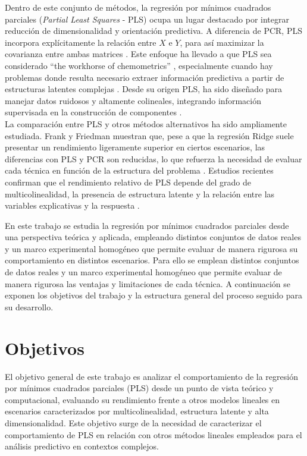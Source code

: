 \documentclass[12pt,a4paper]{report}
\begin{document}
Dentro de este conjunto de métodos, la regresión por mínimos cuadrados parciales (\textit{Partial Least Squares} - PLS) ocupa un lugar destacado por integrar reducción de dimensionalidad y orientación predictiva. A diferencia de PCR, PLS incorpora explícitamente la relación entre $X$ e $Y$, para así maximizar la covarianza entre ambas matrices \cite{geladi1986}. Este enfoque ha llevado a que PLS sea considerado “the workhorse of chemometrics” \cite{geladi1986}, especialmente cuando hay problemas donde resulta necesario extraer información predictiva a partir de estructuras latentes complejas \cite{alciaturi2003}. Desde su origen PLS, ha sido diseñado para manejar datos ruidosos y altamente colineales, integrando información supervisada en la construcción de componentes \cite{abdi2010}.\\

La comparación entre PLS y otros métodos alternativos ha sido ampliamente estudiada. Frank y Friedman muestran que, pese a que la regresión Ridge suele presentar un rendimiento ligeramente superior en ciertos escenarios, las diferencias con PLS y PCR son reducidas, lo que refuerza la necesidad de evaluar cada técnica en función de la estructura del problema \cite{frank1993}. Estudios recientes confirman que el rendimiento relativo de PLS depende del grado de multicolinealidad, la presencia de estructura latente y la relación entre las variables explicativas y la respuesta \cite{liu2022}.

En este trabajo se estudia la regresión por mínimos cuadrados parciales desde una perspectiva teórica y aplicada, empleando distintos conjuntos de datos reales y un marco experimental homogéneo que permite evaluar de manera rigurosa su comportamiento en distintos escenarios. Para ello se emplean distintos conjuntos de datos reales y un marco experimental homogéneo que permite evaluar de manera rigurosa las ventajas y limitaciones de cada técnica. A continuación se exponen los objetivos del trabajo y la estructura general del proceso seguido para su desarrollo.

\section{Objetivos}

El objetivo general de este trabajo es analizar el comportamiento de la regresión por mínimos cuadrados parciales (PLS) desde un punto de vista teórico y computacional, evaluando su rendimiento frente a otros modelos lineales en escenarios caracterizados por multicolinealidad, estructura latente y alta dimensionalidad. Este objetivo surge de la necesidad de caracterizar el comportamiento de PLS en relación con otros métodos lineales empleados para el análisis predictivo en contextos complejos.
\end{document}
